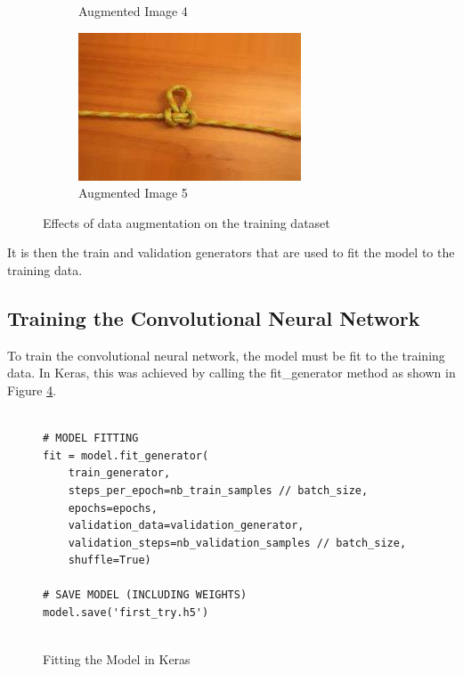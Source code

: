 \documentclass{l4proj}
\begin{document}
\begin{figure}[h]
\begin{subfigure}{.33\textwidth}
        \caption{Augmented Image 4}
        \label{fig:Aug4}
	\end{subfigure}
	\begin{subfigure}{.33\textwidth}
		\centering
        \includegraphics[width=\linewidth]{augmented5}
        \caption{Augmented Image 5}
        \label{fig:Aug5}
	\end{subfigure}
	\caption{Effects of data augmentation on the training dataset}
    \label{fig:DataAugmentationExamples}
\end{figure}

It is then the train and validation generators that are used to fit the model to the training data.

\subsection{Training the Convolutional Neural Network}
To train the convolutional neural network, the model must be fit to the training data.
In Keras, this was achieved by calling the fit\_generator method as shown in Figure \ref{fig:KerasModelTraining}.

\begin{figure}
\caption{Fitting the Model in Keras}
\label{fig:KerasModelTraining}
\begin{lstlisting}

# MODEL FITTING
fit = model.fit_generator(
    train_generator,
    steps_per_epoch=nb_train_samples // batch_size,
    epochs=epochs,
    validation_data=validation_generator,
    validation_steps=nb_validation_samples // batch_size,
    shuffle=True)

# SAVE MODEL (INCLUDING WEIGHTS)
model.save('first_try.h5')


\end{lstlisting}
\end{figure}
\end{document}
